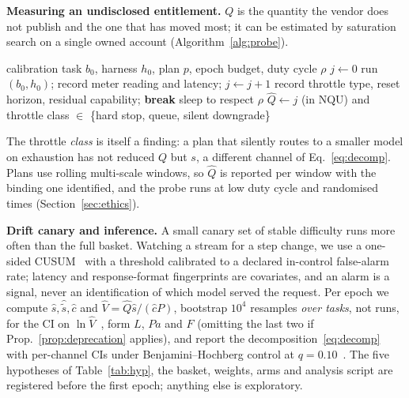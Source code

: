 \documentclass[conference]{IEEEtran}
\theoremstyle{plain}
\theoremstyle{definition}
\newcommand{\NQU}{\ensuremath{\mathrm{NQU}}}
\begin{document}
\textbf{Measuring an undisclosed entitlement.} $Q$ is the quantity the vendor
does not publish and the one that has moved most; it can be estimated by
saturation search on a single owned account (Algorithm~\ref{alg:probe}).

\begin{algorithm}[t]
\caption{Entitlement saturation probe}
\label{alg:probe}
\begin{algorithmic}[1]
\Require calibration task $b_0$, harness $h_0$, plan $p$, epoch budget, duty cycle $\rho$
\State $j\gets0$
  \State run $(b_0,h_0)$; record meter reading and latency; $j\gets j+1$
     \State record throttle type, reset horizon, residual capability; \textbf{break}
  \EndIf
  \State sleep to respect $\rho$ 
\EndWhile
\State \Return $\hat Q\gets j$ (in \NQU{}) and throttle class $\in$ \{hard stop, queue, silent downgrade\}
\end{algorithmic}
\end{algorithm}

The throttle \emph{class} is itself a finding: a plan that silently routes to a
smaller model on exhaustion has not reduced $Q$ but $s$, a different channel of
Eq.~\eqref{eq:decomp}. Plans use rolling multi-scale windows, so $\hat Q$ is
reported per window with the binding one identified, and the probe runs at low
duty cycle and randomised times (Section~\ref{sec:ethics}).

\textbf{Drift canary and inference.} A small canary set of stable difficulty
runs more often than the full basket. Watching a stream for a step change, we
use a one-sided CUSUM~\cite{page1954cusum} with a threshold calibrated to a
declared in-control false-alarm rate; latency and response-format fingerprints
are covariates, and an alarm is a signal, never an identification of which
model served the request. Per epoch we compute $\hat s,\hat{\tilde s},\hat c$
and $\hat V=\hat Q\hat s/(\hat cP)$, bootstrap $10^4$ resamples \emph{over
tasks}, not runs, for the CI on $\ln\hat V$~\cite{efron1994bootstrap}, form
$L$, $Pa$ and $F$ (omitting the last two if Prop.~\ref{prop:deprecation}
applies), and report the decomposition~\eqref{eq:decomp} with per-channel CIs
under Benjamini--Hochberg control at $q=0.10$~\cite{benjamini1995fdr}. The five
hypotheses of Table~\ref{tab:hyp}, the basket, weights, arms and analysis
script are registered before the first epoch; anything else is exploratory.
\end{document}
